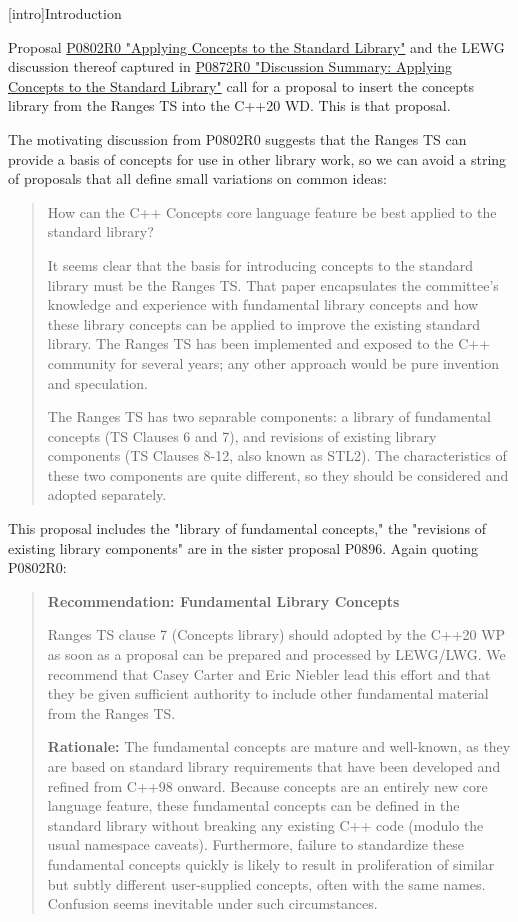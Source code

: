 [intro]{Introduction}

Proposal \href{https://wg21.link/p0802r0}%
{P0802R0 "Applying Concepts to the Standard Library"} and the LEWG discussion
thereof captured in \href{https://wg21.link/p0872r0}%
{P0872R0 "Discussion Summary: Applying Concepts to the Standard Library"} call
for a proposal to insert the concepts library from the Ranges TS into the C++20
WD. This is that proposal.

The motivating discussion from P0802R0 suggests that the Ranges TS can provide a
basis of concepts for use in other library work, so we can avoid a string of
proposals that all define small variations on common ideas:
\begin{quote}
How can the C++ Concepts core language feature be best applied to the standard
library?

It seems clear that the basis for introducing concepts to the standard library
must be the Ranges TS. That paper encapsulates the committee's knowledge and
experience with fundamental library concepts and how these library concepts can
be applied to improve the existing standard library. The Ranges TS has been
implemented and exposed to the C++ community for several years; any other
approach would be pure invention and speculation.

The Ranges TS has two separable components: a library of fundamental concepts
(TS Clauses 6 and 7), and revisions of existing library components (TS Clauses
8-12, also known as STL2). The characteristics of these two components are quite
different, so they should be considered and adopted separately.
\end{quote}

This proposal includes the "library of fundamental concepts," the "revisions of
existing library components" are in the sister proposal P0896. Again quoting P0802R0:
\begin{quote}
\textbf{Recommendation: Fundamental Library Concepts}

Ranges TS clause 7 (Concepts library) should adopted by the C++20 WP as soon as
a proposal can be prepared and processed by LEWG/LWG. We recommend that Casey
Carter and Eric Niebler lead this effort and that they be given sufficient
authority to include other fundamental material from the Ranges TS.

\textbf{Rationale:} The fundamental concepts are mature and well-known, as they are
based on standard library requirements that have been developed and refined from
C++98 onward. Because concepts are an entirely new core language feature, these
fundamental concepts can be defined in the standard library without breaking any
existing C++ code (modulo the usual namespace caveats). Furthermore, failure to
standardize these fundamental concepts quickly is likely to result in
proliferation of similar but subtly different user-supplied concepts, often with
the same names. Confusion seems inevitable under such circumstances.
\end{quote}


